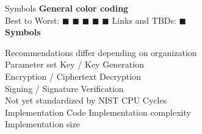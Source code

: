 

\begin{minipage}[t]{0.4\textwidth} %
    \vspace{-3mm}
    \begin{algorithmbox}{Symbols}
        \scriptsize
        {\bfseries  General color coding}\\[0.5\baselineskip]
        Best to Worst:
        \textcolor{themegreen}{$\blacksquare$}
        \textcolor{themeyellow}{$\blacksquare$}
        \textcolor{themeorange}{$\blacksquare$}
        \textcolor{themered}{$\blacksquare$}
        \textcolor{themered!65!black}{$\blacksquare$}\quad
        Links and TBDs: \textcolor{themeblue}{$\blacksquare$}\\[\baselineskip]

        {\bfseries  Symbols}
        \vspace{-0.5\baselineskip}
        \begin{tabbing}
            \textcolor{themegreydark}{\faExclamationCircle}\quad Recommendations differ depending on organization\\
            \=\textcolor{themegreydark}{\faSun[regular]}\quad Parameter set\hspace{3cm}
            \=\textcolor{themegreydark}{\faKey}\quad Key / Key Generation\\
            \>\textcolor{themegreydark}{\faLock}\quad Encryption / Ciphertext
            \>\textcolor{themegreydark}{\faUnlock}\quad Decryption\\
            \>\textcolor{themegreydark}{\faPen}\quad Signing / Signature
            \>\textcolor{themegreydark}{\faQuestionCircle}\quad Verification\\
            \>\textcolor{themegreydark}{\faCalendar}\quad Not yet standardized by NIST
            \>\textcolor{themegreydark}{\faMicrochip}\quad CPU Cycles\\
            \>\textcolor{themegreydark}{\faCode}\quad Implementation Code
            \>\hspace{-0.5mm}\hspace{-2mm} Implementation complexity\\
            \>\hspace{-1mm} Implementation size
        \end{tabbing}


\end{algorithmbox}
\end{minipage}
